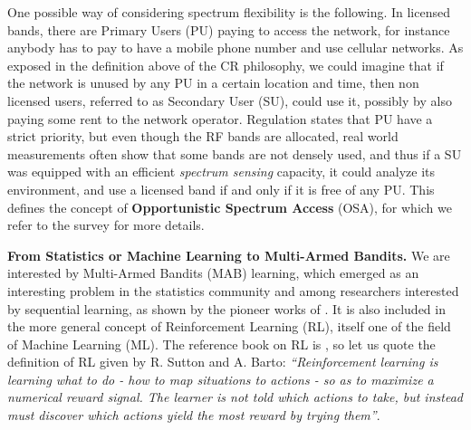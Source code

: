 One possible way of considering spectrum flexibility is the following.
%
In licensed bands, there are Primary Users (PU) paying to access the network, for instance anybody has to pay to have a mobile phone number and use cellular networks.
As exposed in the definition above of the CR philosophy, we could imagine that if the network is unused by any PU in a certain location and time, then non licensed users, referred to as Secondary User (SU), could use it, possibly by also paying some rent to the network operator.
%
Regulation states that PU have a strict priority,
but even though the RF bands are allocated, real world measurements often show that some bands are not densely used, and thus if a SU was equipped with an efficient \emph{spectrum sensing} capacity, it could analyze its environment, and use a licensed band if and only if it is free of any PU.
This defines the concept of \textbf{Opportunistic Spectrum Access} (OSA), for which we refer to the survey \cite{Zhao07} for more details.



\textbf{From Statistics or Machine Learning to Multi-Armed Bandits.}
%
We are interested by Multi-Armed Bandits (MAB) learning,
which emerged as an interesting problem in the statistics community and among researchers interested by sequential learning, as shown by the pioneer works of \cite{Thompson33,Robbins52,LaiRobbins85}.
It is also included in the more general concept of Reinforcement Learning (RL), itself one of the field of Machine Learning (ML).
%
The reference book on RL is \cite{SuttonBarto2018}, so let us quote the definition of RL given by R. Sutton and A. Barto:
\emph{``Reinforcement learning is learning what to do - how to map situations to actions - so
as to maximize a numerical reward signal. The learner is not told which actions to
take, but instead must discover which actions yield the most reward by trying them''}.



